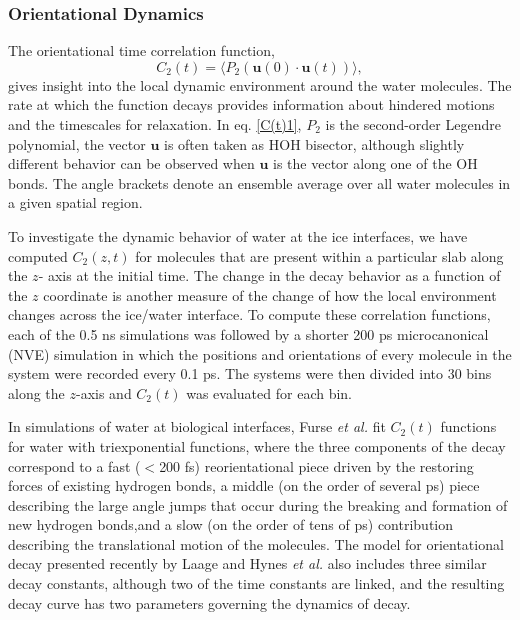 \subsubsection{Orientational Dynamics}
The orientational time correlation function,
\begin{equation}\label{C(t)1}
  C_{2}(t)=\langle P_{2}(\mathbf{u}(0) \cdot \mathbf{u}(t)) \rangle,
\end{equation}
gives insight into the local dynamic environment around the water
molecules.  The rate at which the function decays provides information
about hindered motions and the timescales for relaxation.  In
eq. \eqref{C(t)1}, $P_{2}$ is the second-order Legendre polynomial,
the vector $\mathbf{u}$ is often taken as HOH bisector, although
slightly different behavior can be observed when $\mathbf{u}$ is the
vector along one of the OH bonds.  The angle brackets denote an
ensemble average over all water molecules in a given spatial region.

To investigate the dynamic behavior of water at the ice interfaces, we
have computed $C_{2}(z,t)$ for molecules that are present within a
particular slab along the $z$- axis at the initial time.  The change
in the decay behavior as a function of the $z$ coordinate is another
measure of the change of how the local environment changes across the
ice/water interface.  To compute these correlation functions, each of
the 0.5 ns simulations was followed by a shorter 200 ps microcanonical
(NVE) simulation in which the positions and orientations of every
molecule in the system were recorded every 0.1 ps. The systems were
then divided into 30 bins along the $z$-axis and $C_2(t)$ was
evaluated for each bin.

In simulations of water at biological interfaces, Furse {\em et al.}
fit $C_2(t)$ functions for water with triexponential
functions,\cite{Furse08} where the three components of the decay
correspond to a fast ($<$200 fs) reorientational piece driven by the
restoring forces of existing hydrogen bonds, a middle (on the order of
several ps) piece describing the large angle jumps that occur during
the breaking and formation of new hydrogen bonds,and a slow (on the
order of tens of ps) contribution describing the translational motion
of the molecules.  The model for orientational decay presented
recently by Laage and Hynes {\em et al.}\cite{Laage08,Laage11} also
includes three similar decay constants, although two of the time
constants are linked, and the resulting decay curve has two parameters
governing the dynamics of decay. 

